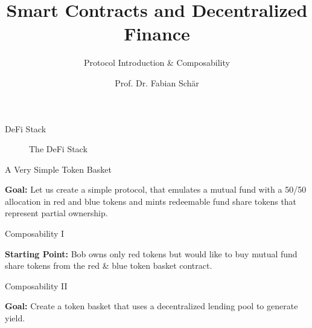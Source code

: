 \documentclass[]{beamer}
\title{Smart Contracts and Decentralized Finance}
\subtitle{Protocol Introduction \& Composability}
\author{Prof. Dr. Fabian Schär}
\institute{University of Basel}
\begin{document}
\thispagestyle{empty}
\begin{frame}[noframenumbering]
	\titlepage
\end{frame}

\begin{frame}{DeFi Stack}
	\begin{figure}
	\scalebox{0.7}{
	\begin{tikzpicture}
	
	\end{tikzpicture}
	}
	\caption{The DeFi Stack \cite{FS:21}}
\end{figure}
\end{frame}


\begin{frame}{A Very Simple Token Basket}

\textbf{Goal:} Let us create a simple protocol, that emulates a mutual fund with a 50/50 allocation in red and blue tokens and mints redeemable fund share tokens that represent partial ownership. \\ \vspace{1em}
	
\begin{figure}
	\begin{tikzpicture}
		
	\end{tikzpicture}	
\end{figure}

\end{frame}


\begin{frame}{Composability I}

\textbf{Starting Point:} Bob owns only red tokens but would like to buy mutual fund share tokens from the red \& blue token basket contract. \\ \vspace{1em}

\begin{figure}
	\begin{tikzpicture}
		
	\end{tikzpicture}
\end{figure}
	
\end{frame}


\begin{frame}{Composability II}

\textbf{Goal:} Create a token basket that uses a decentralized lending pool to generate yield. \\ 
	
\begin{figure}
	\begin{tikzpicture}
		
	\end{tikzpicture}
\end{figure}

\end{frame}
\end{document}
